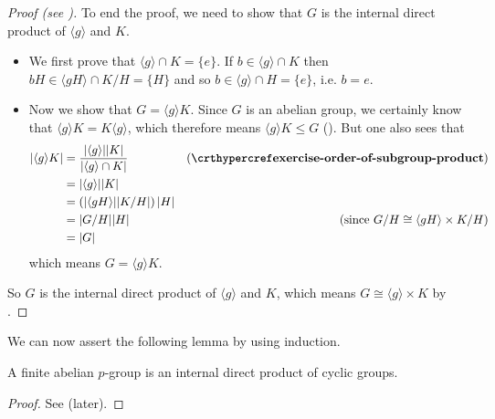 \begin{proof}[Proof (see {\cite[Lemma 13.9]{judson_beezer_2022}})]
    To end the proof, we need to show that $G$ is the internal direct product of $\langle g\rangle$ and $K$.
    \begin{itemize}
        \item We first prove that $\langle g\rangle \cap K = \{e\}$. If $b \in \langle g\rangle \cap K$ then $bH \in \langle gH\rangle \cap K/H = \{H\}$ and so $b \in \langle g \rangle \cap H = \{e\}$, i.e. $b = e$.

        \item Now we show that $G = \langle g\rangle K$. Since $G$ is an abelian group, we certainly know that $\langle g\rangle K = K\langle g\rangle$, which therefore means $\langle g\rangle K \leq G$ (). But one also sees that
        \begin{align*}
            |\langle g\rangle K| &= \frac{|\langle g\rangle||K|}{|\langle g\rangle \cap K|} & (\myref{exercise-order-of-subgroup-product})\\
            &= |\langle g\rangle||K|\\
            &= \left(|\langle gH \rangle||K/H|\right)|H|\\
            &= |G/H||H| & (\text{since }G/H \cong \langle gH \rangle \times K/H)\\
            &= |G|
        \end{align*}
        which means $G = \langle g\rangle K$.
    \end{itemize}
    So $G$ is the internal direct product of $\langle g\rangle$ and $K$, which means $G \cong \langle g\rangle \times K$ by .
\end{proof}

We can now assert the following lemma by using induction.

\begin{lemma}\label{lemma-fundamental-theorem-of-finite-abelian-groups-3}
    A finite abelian $p$-group is an internal direct product of cyclic groups.
\end{lemma}
\begin{proof}
    See  (later).
\end{proof}

